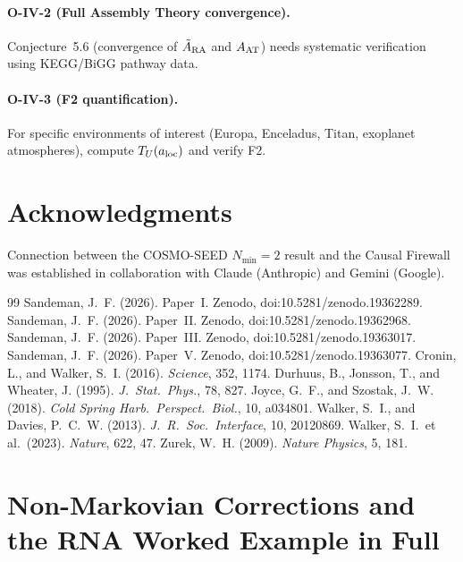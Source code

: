 \documentclass[12pt,a4paper]{article}
\begin{document}
\paragraph{O-IV-2 (Full Assembly Theory convergence).}  Conjecture~5.6 (convergence of $\tilde{A}_{\rm RA}$ and $A_{\rm AT}$) needs systematic verification using KEGG/BiGG pathway data.

\paragraph{O-IV-3 (F2 quantification).}  For specific environments of interest (Europa, Enceladus, Titan, exoplanet atmospheres), compute $T_U(a_{\rm loc})$ and verify F2.

\section*{Acknowledgments}
Connection between the COSMO-SEED $N_{\min}=2$ result and the Causal Firewall was established in collaboration with Claude (Anthropic) and Gemini (Google).


\begin{thebibliography}{99}
 Sandeman, J.~F. (2026). Paper~I. Zenodo, doi:10.5281/zenodo.19362289.
 Sandeman, J.~F. (2026). Paper~II. Zenodo, doi:10.5281/zenodo.19362968.
 Sandeman, J.~F. (2026). Paper~III. Zenodo, doi:10.5281/zenodo.19363017.
 Sandeman, J.~F. (2026). Paper~V. Zenodo, doi:10.5281/zenodo.19363077.
 Cronin, L., and Walker, S.~I. (2016). \textit{Science}, 352, 1174.
 Durhuus, B., Jonsson, T., and Wheater, J. (1995). \textit{J.\ Stat.\ Phys.}, 78, 827.
 Joyce, G.~F., and Szostak, J.~W. (2018). \textit{Cold Spring Harb.\ Perspect.\ Biol.}, 10, a034801.
 Walker, S.~I., and Davies, P.~C.~W. (2013). \textit{J.~R.\ Soc.\ Interface}, 10, 20120869.
 Walker, S.~I.\ et al.\ (2023). \textit{Nature}, 622, 47.
 Zurek, W.~H. (2009). \textit{Nature Physics}, 5, 181.
\end{thebibliography}

\section{Non-Markovian Corrections and the RNA Worked Example in Full}\label{sec:rna_full}
\end{document}
